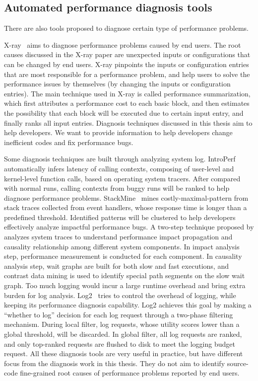 \subsection{Automated performance diagnosis tools}
There are also tools proposed to diagnose certain
type of performance problems.

X-ray~\citep{XRayOSDI} aims to diagnose performance 
problems caused by end users. The root causes discussed in the X-ray paper are 
unexpected inputs or configurations that can be changed by end users. 
X-ray pinpoints the inputs or configuration entries that are most 
responsible for a performance problem, and help users to solve the 
performance issues by themselves (by changing the inputs or configuration
entries). 
The main technique used in X-ray is called performance summarization, which 
first attributes a performance 
cost to each basic block, and then estimates the possibility that each block 
will be executed 
due to certain input entry, and finally ranks all input entries.
Diagnosis techniques discussed in this thesis aim to help developers. 
We want to provide 
information to help developers change inefficient codes and fix performance bugs.

Some diagnosis techniques are built through analyzing system log. 
IntroPerf~\citep{IntroPerf} automatically infers latency of calling contexts, 
composing of user-level and kernel-level function calls, 
based on operating system tracers. 
After compared with normal runs, 
calling contexts from buggy runs will be ranked to help diagnose performance problems. 
StackMine~\citep{TaoICSE2012} mines costly-maximal-pattern from stack traces collected from event handlers, 
whose response time is longer than a predefined threshold. 
Identified patterns will be clustered to help developers effectively analyze impactful performance bugs. 
A two-step technique proposed by \citet{TaoAsplos2014} analyzes system traces to 
understand performance impact propagation and causality relationship among different system components. 
In impact analysis step, performance measurement is conducted for each component. 
In causality analysis step, 
wait graphs are built for both slow and fast executions, 
and contrast data mining is used to identify special path segments on the slow wait graph. 
Too much logging would incur a large runtime overhead and bring extra burden for log analysis. 
Log2~\citep{TaoATC2015} tries to control the overhead of logging, 
while keeping its performance diagnosis capability. 
Log2 achieves this goal by making a ``whether to log'' decision for each log request through a two-phase filtering mechanism. 
During local filter, log requests, whose utility scores lower than a global threshold, will be discarded. 
In global filter, all log requests are ranked, 
and only top-ranked requests are flushed to disk to meet the logging budget request. 
All these diagnosis tools are very useful in practice, but have different
focus from the diagnosis work in this thesis. They
do not aim to identify source-code fine-grained 
root causes of performance problems reported by end users.


